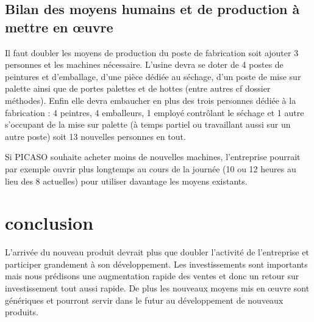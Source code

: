 \documentclass[a4paper]{../TPInsa}
\begin{document}
	\subsection{Bilan des moyens humains et de production à mettre en œuvre}

	Il faut doubler les moyens de production du poste de fabrication soit ajouter 3 personnes et les machines nécessaire. 
	L'usine devra se doter de 4 postes de peintures et d'emballage, d'une pièce dédiée au séchage, d'un poste de mise sur palette ainsi que de portes palettes et de hottes (entre autres cf dossier méthodes). 
	Enfin elle devra embaucher en plus des trois personnes dédiée à la fabrication : 4 peintres, 4 emballeurs, 1 employé contrôlant le séchage et 1 autre s'occupant de la mise sur palette (à temps partiel ou travaillant aussi sur un autre poste) soit 13 nouvelles personnes en tout. 
	
	Si PICASO souhaite acheter moins de nouvelles machines, l'entreprise pourrait par exemple ouvrir plus longtemps au cours de la journée (10 ou 12 heures au lieu des 8 actuelles) pour utiliser davantage les moyens existants. 

	\section{conclusion}

L'arrivée du nouveau produit devrait plus que doubler l'activité de l'entreprise et participer grandement à son développement. Les investissements sont importants mais nous prédisons une augmentation rapide des ventes et donc un retour sur investissement tout aussi rapide. De plus les nouveaux moyens mis en œuvre sont génériques et pourront servir dans le futur au développement de nouveaux produits. 




















	
\end{document}
